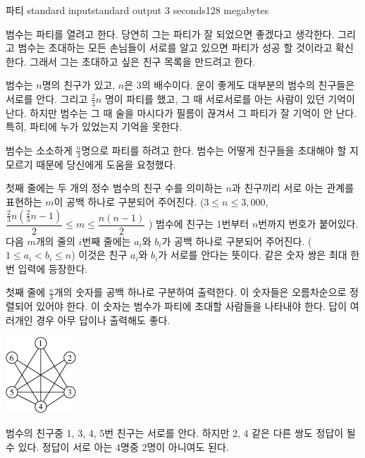 \begin{problem}{파티}
	{standard input}{standard output}
	{3 seconds}{128 megabytes}{}
	
	
범수는 파티를 열려고 한다. 당연히 그는 파티가 잘 되었으면 좋겠다고 생각한다. 그리고 범수는 초대하는 모든 손님들이 서로를 알고 있으면 파티가 성공 할 것이라고 확신한다. 그래서 그는 초대하고 싶은 친구 목록을 만드려고 한다.

범수는 $n$명의 친구가 있고, $n$은 3의 배수이다. 운이 좋게도 대부분의 범수의 친구들은 서로를 안다. 그리고 $\frac{2}{3}n$ 명이 파티를 했고, 그 때 서로서로를 아는 사람이 있던 기억이 난다. 하지만 범수는 그 때 술을 마시다가 필름이 끊겨서 그 파티가 잘 기억이 안 난다. 특히, 파티에 누가 있었는지 기억을 못한다. 


범수는 소소하게 $\frac{n}{3}$명으로 파티를 하려고 한다. 범수는 어떻게 친구들을 초대해야 할 지 모르기 때문에 당신에게 도움을 요청했다.

	

	\InputFile
	
	첫째 줄에는 두 개의 정수 범수의 친구 수를 의미하는 $n$과 친구끼리 서로 아는 관계를 표현하는 $m$이 공백 하나로 구분되어 주어진다. ($3 \le n \le 3,000$, $\dfrac{\frac{2}{3}n\left(\frac{2}{3}n-1\right)}{2} \le m \le \dfrac{n(n-1)}{2}$ ) 범수에 친구는 1번부터 $n$번까지 번호가 붙어있다. 다음 $m$개의 줄의 $i$번째 줄에는 $a_i$와 $b_i$가 공백 하나로 구분되어 주어진다. ($1 \le a_i < b_i \le n$) 이것은 친구 $a_i$와 $b_i$가 서로를 안다는 뜻이다. 같은 숫자 쌍은 최대 한 번 입력에 등장한다.
	
	\OutputFile
	
	첫째 줄에 $\frac{n}{3}$개의 숫자를 공백 하나로 구분하여 출력한다. 이 숫자들은 오름차순으로 정렬되어 있어야 한다. 이 숫자는 범수가 파티에 초대할 사람들을 나타내야 한다. 답이 여러개인 경우 아무 답이나 출력해도 좋다.
	\Examples
		
	\begin{example}
	\end{example}
	
	\Note
	
	\begin{center}
	\includegraphics[]{imp.png}
	\end{center}
	
	범수의 친구중 1, 3, 4, 5번 친구는 서로를 안다. 하지만 2, 4 같은 다른 쌍도 정답이 될 수 있다. 정답이 서로 아는 4명중 2명이 아니여도 된다.
	
\end{problem}

